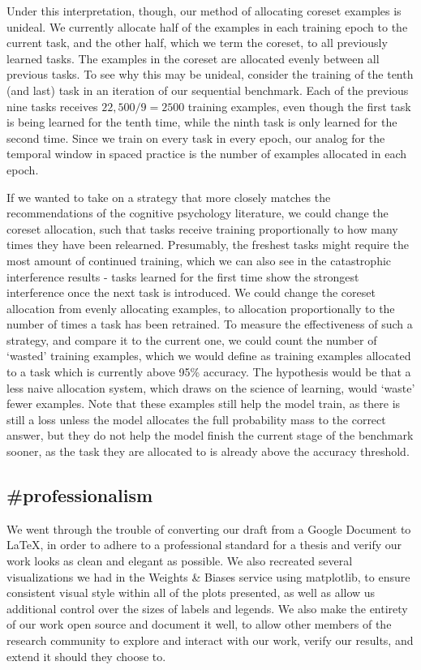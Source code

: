Under this interpretation, though, our method of allocating coreset examples is unideal. We currently allocate half of the examples in each training epoch to the current task, and the other half, which we term the coreset, to all previously learned tasks. The examples in the coreset are allocated evenly between all previous tasks. To see why this may be unideal, consider the training of the tenth (and last) task in an iteration of our sequential benchmark. Each of the previous nine tasks receives $22,500 / 9 = 2500$ training examples, even though the first task is being learned for the tenth time, while the ninth task is only learned for the second time. Since we train on every task in every epoch, our analog for the temporal window in spaced practice is the number of examples allocated in each epoch. 

If we wanted to take on a strategy that more closely matches the recommendations of the cognitive psychology literature, we could change the coreset allocation, such that tasks receive training proportionally to how many times they have been relearned. Presumably, the freshest tasks might require the most amount of continued training, which we can also see in the catastrophic interference results - tasks learned for the first time show the strongest interference once the next task is introduced. We could change the coreset allocation from evenly allocating examples, to allocation proportionally to the number of times a task has been retrained. To measure the effectiveness of such a strategy, and compare it to the current one, we could count the number of `wasted' training examples, which we would define as training examples allocated to a task which is currently above 95\% accuracy. The hypothesis would be that a less naive allocation system, which draws on the science of learning, would ‘waste’ fewer examples. Note that these examples still help the model train, as there is still a loss unless the model allocates the full probability mass to the correct answer, but they do not help the model finish the current stage of the benchmark sooner, as the task they are allocated to is already above the accuracy threshold. 

\subsection{\#professionalism}
We went through the trouble of converting our draft from a Google Document to LaTeX, in order to adhere to a professional standard for a thesis and verify our work looks as clean and elegant as possible. We also recreated several visualizations we had in the Weights \& Biases service using matplotlib, to ensure consistent visual style within all of the plots presented, as well as allow us additional control over the sizes of labels and legends. We also make the entirety of our work open source and document it well, to allow other members of the research community to explore and interact with our work, verify our results, and extend it should they choose to. 

